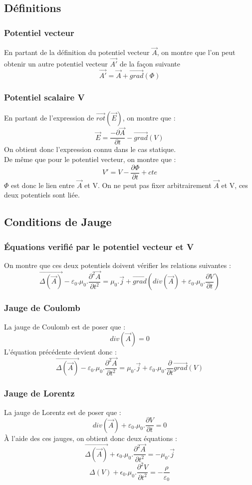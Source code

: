 \subsection{Définitions}
\subsubsection{Potentiel vecteur}
En partant de la définition du potentiel vecteur $\overrightarrow{A}$, on montre que l'on peut obtenir un autre potentiel vecteur $\overrightarrow{A'}$ de la façon suivante
$$\overrightarrow{A'} = \overrightarrow{A} + \overrightarrow{grad}(\Phi)$$
\subsubsection{Potentiel scalaire V}
En partant de l'expression de $\overrightarrow{rot}(\overrightarrow{E})$, on montre que : 
$$\overrightarrow{E} = \dfrac{-\partial \overrightarrow{A}}{\partial t} - \overrightarrow{grad}(V)$$
On obtient donc l'expression connu dans le cas statique.\\
De même que pour le potentiel vecteur, on montre que : 
$$V' = V - \dfrac{\partial \Phi}{\partial t} + cte$$
$\Phi$ est donc le lien entre $\overrightarrow{A}$ et V. On ne peut pas fixer arbitrairement $\overrightarrow{A}$ et V, ces deux potentiels sont liée.
\subsection{Conditions de Jauge}
\subsubsection{Équations verifié par le potentiel vecteur et V}
On montre que ces deux potentiels doivent vérifier les relations suivantes : 
$$\overrightarrow{\Delta(\overrightarrow{A})} - \varepsilon_0.\mu_0.\dfrac{\partial^2 \overrightarrow{A}}{\partial t^2} = \mu_0.\overrightarrow{j} + \overrightarrow{grad}(div(\overrightarrow{A})+\varepsilon_0.\mu_0.\dfrac{\partial V}{\partial t})$$
\subsubsection{Jauge de Coulomb}
La jauge de Coulomb est de poser que : 
$$div(\overrightarrow{A}) = 0$$
L'équation précédente devient donc : 
$$\overrightarrow{\Delta(\overrightarrow{A})} - \varepsilon_0.\mu_0.\dfrac{\partial^2 \overrightarrow{A}}{\partial t^2} = \mu_0.\overrightarrow{j} + \varepsilon_0.\mu_0.\dfrac{\partial}{\partial t}\overrightarrow{grad}(V)$$
\subsubsection{Jauge de Lorentz}
La jauge de Lorentz est de poser que : 
$$div(\overrightarrow{A})+\varepsilon_0.\mu_0.\dfrac{\partial V}{\partial t} = 0$$
À l'aide des ces jauges, on obtient donc deux équations : 
$$\overrightarrow{\Delta(\overrightarrow{A})} + \epsilon_0.\mu_0.\dfrac{\partial^2 \overrightarrow{A}}{\partial t^2} = -\mu_0.\overrightarrow{j}$$
$$\Delta(V) + \epsilon_0.\mu_0.\dfrac{\partial^2 V}{\partial t^2} = -\dfrac{\rho}{\varepsilon_0}$$

